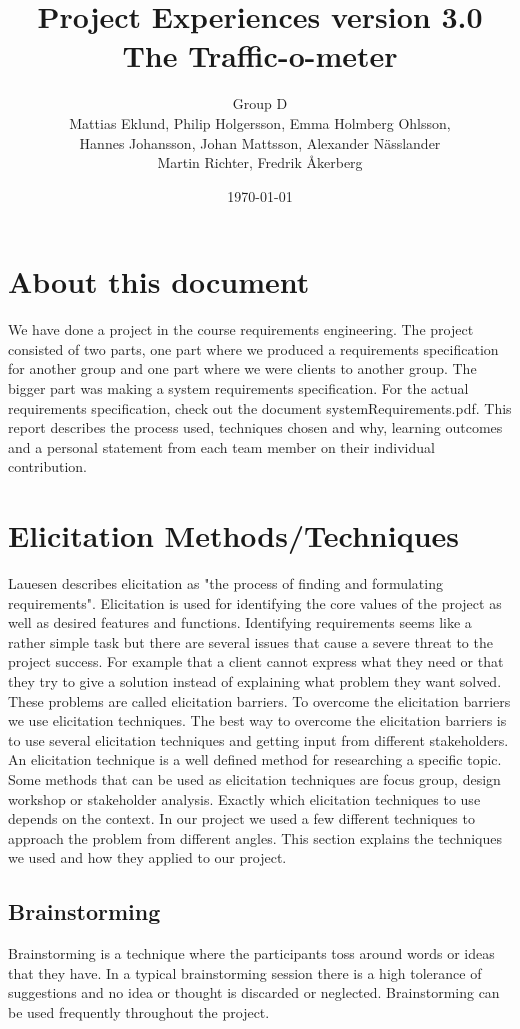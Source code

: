 \documentclass[a4paper]{article}
\title{Project Experiences version 3.0 \\ The Traffic-o-meter}
\author{Group D\\ Mattias Eklund, Philip Holgersson, Emma Holmberg Ohlsson,\\ Hannes Johansson, Johan Mattsson, Alexander Nässlander\\Martin Richter, Fredrik Åkerberg}
\date{\today}
\begin{document}
	\maketitle
	\thispagestyle{empty}
	\setcounter{page}{0}
	\pagebreak
	\tableofcontents
	\pagebreak
	
	\section{About this document}
We have done a project in the course requirements engineering. The project consisted of two parts, one part where we produced a requirements specification for another group and one part where we were clients to another group. The bigger part was making a system requirements specification. For the actual requirements specification, check out the document systemRequirements.pdf. This report describes the process used, techniques chosen and why, learning outcomes and a personal statement from each team member on their individual contribution.

	\section{Elicitation Methods/Techniques}
Lauesen describes elicitation as "the process of finding and formulating requirements". Elicitation is used for identifying the core values of the project as well as desired features and functions. Identifying requirements seems like a rather simple task but there are several issues that cause a severe threat to the project success. For example that a client cannot express what they need or that they try to give a solution instead of explaining what problem they want solved. These problems are called elicitation barriers. To overcome the elicitation barriers we use elicitation techniques. The best way to overcome the elicitation barriers is to use several elicitation techniques and getting input from different stakeholders. An elicitation technique is a well defined method for researching a specific topic. Some methods that can be used as elicitation techniques are focus group, design workshop or stakeholder analysis. Exactly which elicitation techniques to use depends on the context. In our project we used a few different techniques to approach the problem from different angles. This section explains the techniques we used and how they applied to our project.
	\subsection{Brainstorming}
Brainstorming is a technique where the participants toss around words or ideas that they have. In a typical brainstorming session there is a high tolerance of suggestions and no idea or thought is discarded or neglected. Brainstorming can be used frequently throughout the project.
\end{document}
